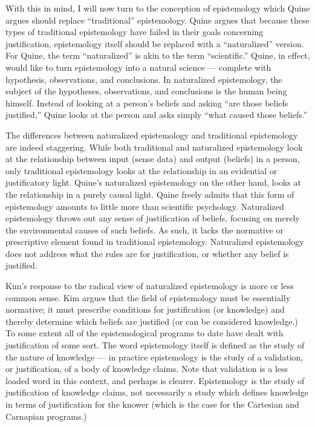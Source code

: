 \documentclass[12pt,letterpaper]{report}
\begin{document}
With this in mind, I will now turn to the conception of epistemology which Quine argues should replace ``traditional'' epistemology. Quine argues that because these types of traditional epistemology have failed in their goals concerning justification, epistemology itself should be replaced with a ``naturalized'' version. For Quine, the term ``naturalized'' is akin to the term ``scientific.'' Quine, in effect, would like to turn epistemology into a natural science --- complete with hypothesis, observations, and conclusions. In naturalized epistemology, the subject of the hypotheses, observations, and conclusions is the human being himself. Instead of looking at a person's beliefs and asking ``are those beliefs justified,'' Quine looks at the person and asks simply ``what caused those beliefs.''

The differences between naturalized epistemology and traditional epistemology are indeed staggering. While both traditional and naturalized epistemology look at the relationship between input (sense data) and output (beliefs) in a person, only traditional epistemology looks at the relationship in an evidential or justificatory light. Quine's naturalized epistemology on the other hand, looks at the relationship in a purely causal light. Quine freely admits that this form of epistemology amounts to little more than scientific psychology. Naturalized epistemology throws out any sense of justification of beliefs, focusing on merely the environmental causes of such beliefs. As such, it lacks the normative or prescriptive element found in traditional epistemology. Naturalized epistemology does not address what the rules are for justification, or whether any belief is justified.

Kim's response to the radical view of naturalized epistemology is more or less common sense. Kim argues that the field of epistemology must be essentially normative; it must prescribe conditions for justification (or knowledge) and thereby determine which beliefs are justified (or can be considered knowledge.) To some extent all of the epistemological programs to date have dealt with justification of some sort. The word epistemology itself is defined as the study of the nature of knowledge --- in practice epistemology is the study of a validation, or justification, of a body of knowledge claims. Note that validation is a less loaded word in this context, and perhaps is clearer. Epistemology is the study of justification of knowledge claims, not necessarily a study which defines knowledge in terms of justification for the knower (which is the case for the Cartesian and Carnapian programs.)
\end{document}

